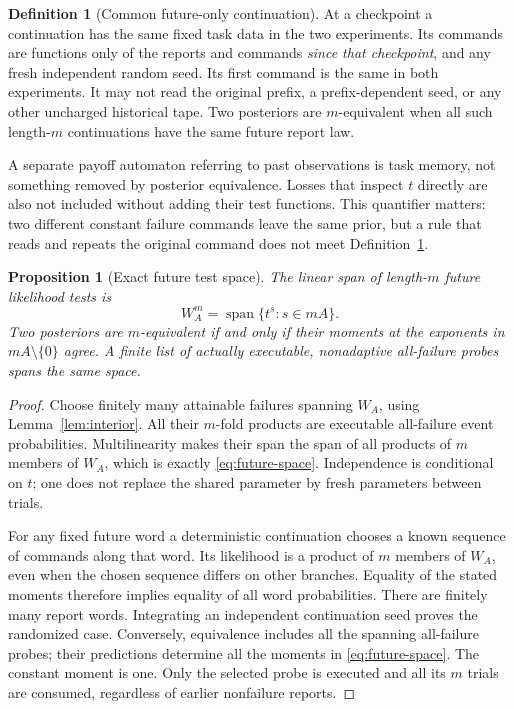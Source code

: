 \documentclass[11pt]{amsart}
\newtheorem{proposition}[theorem]{Proposition}
\theoremstyle{definition}\newtheorem{definition}[theorem]{Definition}
\theoremstyle{remark}\newtheorem{remark}[theorem]{Remark}
\DeclareMathOperator{\spanop}{span}\DeclareMathOperator{\rank}{rank}
\begin{document}
\begin{definition}[Common future-only continuation]\label{def:future}
At a checkpoint a continuation has the same fixed task data in the two
experiments. Its commands are functions only of the reports and commands
\emph{since that checkpoint}, and any fresh independent random seed. Its
first command is the same in both experiments. It may not read the
original prefix, a prefix-dependent seed, or any other uncharged historical
tape. Two posteriors are $m$-equivalent when all such length-$m$
continuations have the same future report law.
\end{definition}

A separate payoff automaton referring to past observations is task memory,
not something removed by posterior equivalence. Losses that inspect $t$
directly are also not included without adding their test functions. This
quantifier matters: two different constant failure commands leave the
same prior, but a rule that reads and repeats the original command does
not meet Definition~\ref{def:future}.

\begin{proposition}[Exact future test space]\label{prop:tests}
The linear span of length-$m$ future likelihood tests is
\begin{equation}\label{eq:future-space}
 W_A^m=\spanop\{t^s:s\in mA\}.
\end{equation}
Two posteriors are $m$-equivalent if and only if their moments at the
exponents in $mA\setminus\{0\}$ agree. A finite list of actually
executable, nonadaptive all-failure probes spans the same space.
\end{proposition}
\begin{proof}
Choose finitely many attainable failures spanning $W_A$, using
Lemma~\ref{lem:interior}. All their $m$-fold products are executable
all-failure event probabilities. Multilinearity makes their span the
span of all products of $m$ members of $W_A$, which is exactly
\eqref{eq:future-space}. Independence is conditional on $t$; one does
not replace the shared parameter by fresh parameters between trials.

For any fixed future word a deterministic continuation chooses a known
sequence of commands along that word. Its likelihood is a product of
$m$ members of $W_A$, even when the chosen sequence differs on other
branches. Equality of the stated moments therefore implies equality of
all word probabilities. There are finitely many report words. Integrating
an independent continuation seed proves the randomized case. Conversely,
equivalence includes all the spanning all-failure probes; their predictions
determine all the moments in \eqref{eq:future-space}. The constant moment
is one. Only the selected probe is executed and all its $m$ trials are
consumed, regardless of earlier nonfailure reports.
\end{proof}
\end{document}
